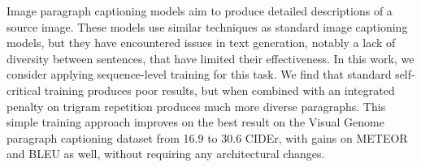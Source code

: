 Image paragraph captioning models aim to produce detailed descriptions of a source image. These models use similar techniques as standard image captioning models, but they have encountered issues in text generation, notably a lack of diversity between sentences, that have limited their effectiveness. In this work, we consider applying sequence-level training for this task. We find that standard self-critical training produces poor results, but when combined with an integrated penalty on trigram repetition produces much more diverse paragraphs. This simple training approach improves on the best result on the Visual Genome paragraph captioning dataset from 16.9 to 30.6 CIDEr, with gains on METEOR and BLEU as well, without requiring any architectural changes.
